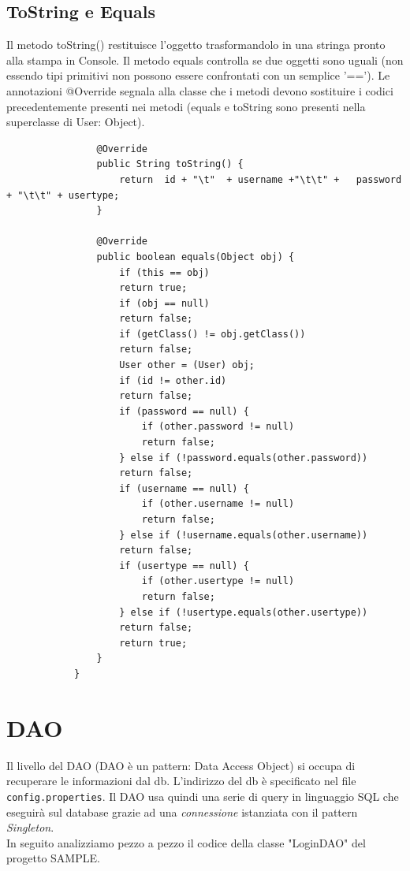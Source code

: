 \documentclass[a4paper,12 pt]{article}
\begin{document}
				\subsection{ToString e Equals}
				
				Il metodo toString() restituisce l'oggetto trasformandolo in una stringa pronto alla stampa in Console. Il metodo equals controlla se due oggetti sono uguali (non essendo tipi primitivi non possono essere confrontati con un semplice '=='). Le annotazioni @Override segnala alla classe che i metodi devono sostituire i codici precedentemente presenti nei metodi (equals e toString sono presenti nella superclasse di User: Object).
				\begin{lstlisting}
				@Override
				public String toString() {
					return  id + "\t"  + username +"\t\t" +   password + "\t\t" + usertype;
				}
				
				@Override
				public boolean equals(Object obj) {
					if (this == obj)
					return true;
					if (obj == null)
					return false;
					if (getClass() != obj.getClass())
					return false;
					User other = (User) obj;
					if (id != other.id)
					return false;
					if (password == null) {
						if (other.password != null)
						return false;
					} else if (!password.equals(other.password))
					return false;
					if (username == null) {
						if (other.username != null)
						return false;
					} else if (!username.equals(other.username))
					return false;
					if (usertype == null) {
						if (other.usertype != null)
						return false;
					} else if (!usertype.equals(other.usertype))
					return false;
					return true;
				}
			}
			\end{lstlisting}
	
	
	\section{DAO}
	Il livello del DAO (DAO è un pattern: Data Access Object) si occupa di recuperare le informazioni dal db. L'indirizzo del db è specificato nel file \texttt{config.properties}.
	Il DAO usa quindi una serie di query in linguaggio SQL che eseguirà sul database grazie ad una \textit{connessione} istanziata con il pattern \textit{Singleton}.\\
	
	In seguito analizziamo pezzo a pezzo il codice della classe "LoginDAO" del progetto SAMPLE.
	
\end{document}
